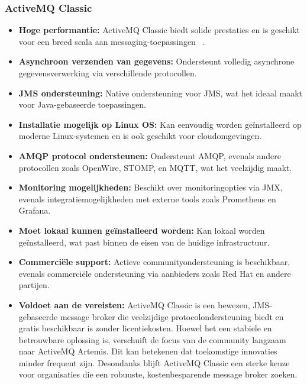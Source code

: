 \subsubsection{ActiveMQ Classic}
\begin{itemize}
    \item \textbf{Hoge performantie:} ActiveMQ Classic biedt solide prestaties en is geschikt voor een breed scala aan messaging-toepassingen ~\autocite{Reock2020}.
    \item \textbf{Asynchroon verzenden van gegevens:} Ondersteunt volledig asynchrone gegevensverwerking via verschillende protocollen.
    \item \textbf{JMS ondersteuning:} Native ondersteuning voor JMS, wat het ideaal maakt voor Java-gebaseerde toepassingen.
    \item \textbf{Installatie mogelijk op Linux OS:} Kan eenvoudig worden geïnstalleerd op moderne Linux-systemen en is ook geschikt voor cloudomgevingen.
    \item \textbf{AMQP protocol ondersteunen:} Ondersteunt AMQP, evenals andere protocollen zoals OpenWire, STOMP, en MQTT, wat het veelzijdig maakt.
    \item \textbf{Monitoring mogelijkheden:} Beschikt over monitoringopties via JMX, evenals integratiemogelijkheden met externe tools zoals Prometheus en Grafana.
    \item \textbf{Moet lokaal kunnen geïnstalleerd worden:} Kan lokaal worden geïnstalleerd, wat past binnen de eisen van de huidige infrastructuur.
    \item \textbf{Commerciële support:} Actieve communityondersteuning is beschikbaar, evenals commerciële ondersteuning via aanbieders zoals Red Hat en andere partijen.
    \item \textbf{Voldoet aan de vereisten:} ActiveMQ Classic is een bewezen, JMS-gebaseerde message broker die veelzijdige protocolondersteuning biedt en gratis beschikbaar is zonder licentiekosten. 
    Hoewel het een stabiele en betrouwbare oplossing is, verschuift de focus van de community langzaam naar ActiveMQ Artemis. 
    Dit kan betekenen dat toekomstige innovaties minder frequent zijn. Desondanks blijft ActiveMQ Classic een sterke keuze voor organisaties die een robuuste, kostenbesparende message broker zoeken.
\end{itemize}
 
